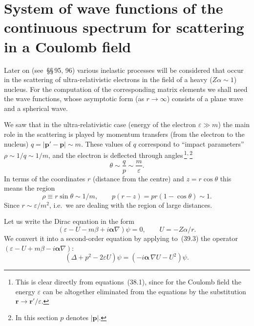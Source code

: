 \section{System of wave functions of the continuous spectrum for scattering in a Coulomb field}

Later on (see~\S\S\,95, 96) various inelastic processes will be considered that occur in the scattering of ultra-relativistic electrons in the field of a heavy ($Z\alpha \sim 1$) nucleus. For the computation of the corresponding matrix elements we shall need the wave functions, whose asymptotic form (as $r\to\infty$) consists of a plane wave and a spherical wave.

We saw that in the ultra-relativistic case (energy of the electron $\varepsilon \gg m$) the main role in the scattering is played by momentum transfers (from the electron to the nucleus) $q = |\mathbf{p}' - \mathbf{p}| \sim m$. These values of $q$ correspond to ``impact parameters'' $\rho \sim 1/q \sim 1/m$, and the electron is deflected through angles\,\footnote{This is clear directly from equations~(38.1), since for the Coulomb field the energy $\varepsilon$ can be altogether eliminated from the equations by the substitution $\mathbf{r}\to\mathbf{r}'/\varepsilon$.}\textsuperscript{,}\,\footnote{In this section $p$ denotes $|\mathbf{p}|$.}
\begin{equation}
\theta \sim \frac{q}{p} \sim \frac{m}{\varepsilon}.
\tag{39.1}
\end{equation}
In terms of the coordinates $r$ (distance from the centre) and $z = r\cos\theta$ this means the region
\begin{equation}
\rho \equiv r\sin\theta \sim 1/m,\qquad p(r - z) = pr(1 - \cos\theta) \sim 1.
\tag{39.2}
\end{equation}
Since $r \sim \varepsilon/m^2$, i.e.\ we are dealing with the region of large distances.

Let us write the Dirac equation in the form
\begin{equation}
(\varepsilon - U - m\beta + i\boldsymbol{\alpha}\nabla)\psi = 0,\qquad U = -Z\alpha/r.
\tag{39.3}
\end{equation}
We convert it into a second-order equation by applying to~(39.3) the operator $(\varepsilon - U + m\beta - i\boldsymbol{\alpha}\nabla)$:
\begin{equation}
(\Delta + p^2 - 2\varepsilon U)\psi = (-i\boldsymbol{\alpha}\,\nabla U - U^2)\psi.
\tag{39.4}
\end{equation}

